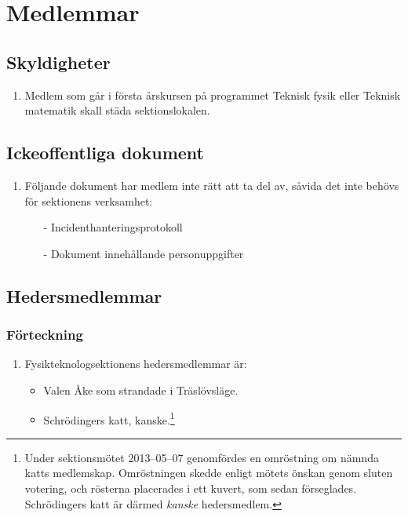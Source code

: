 \documentclass[11pt,a4paper]{article}
\begin{document}
\section{Medlemmar}

\subsection{Skyldigheter}
\begin{enumerate}[\thesubsection .1]
\item Medlem som går i första årskursen på programmet Teknisk fysik
     eller Teknisk matematik skall städa sektionslokalen.
 

\end{enumerate}

\subsection{Ickeoffentliga dokument}

\begin{enumerate}[\thesubsection .1]

  \item Följande dokument har medlem inte rätt att ta del av, såvida det inte behövs för sektionens verksamhet:
  	\begin{itemize}
  		\item[-] Incidenthanteringsprotokoll
	 	\item[-] Dokument innehållande personuppgifter
  	\end{itemize}

\end{enumerate}

\subsection{Hedersmedlemmar}

\subsubsection{Förteckning}

\begin{enumerate}[\thesubsection .1]

  \item Fysikteknologsektionens hedersmedlemmar är:
    \begin{itemize}
      \item Valen Åke som strandade i Träslövsläge.
      \item Schrödingers katt, kanske.\footnote{Under sektionsmötet 2013--05--07 genomfördes en omröstning om nämnda katts medlemskap. Omröstningen skedde enligt mötets önskan genom sluten votering, och rösterna placerades i ett kuvert, som sedan förseglades. Schrödingers katt är därmed \textit{kanske} hedersmedlem.}
    \end{itemize}

\end{enumerate}
\end{document}
